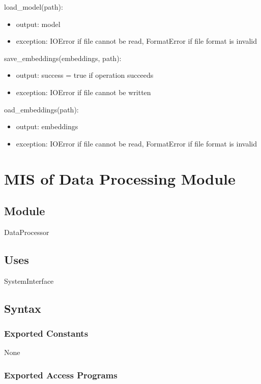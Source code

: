 \documentclass[12pt, titlepage]{article}
\begin{document}
\noindent load\_model(path):
\begin{itemize}
\item output: model
\item exception: IOError if file cannot be read, FormatError if file format is invalid
\end{itemize}

\noindent save\_embeddings(embeddings, path):
\begin{itemize}
\item output: success = true if operation succeeds
\item exception: IOError if file cannot be written
\end{itemize}

\noindent oad\_embeddings(path):
\begin{itemize}
\item output: embeddings
\item exception: IOError if file cannot be read, FormatError if file format is invalid
\end{itemize}


\section{MIS of Data Processing Module} \label{ModuleDP}

\subsection{Module}

DataProcessor

\subsection{Uses}
SystemInterface

\subsection{Syntax}

\subsubsection{Exported Constants}
None
\subsubsection{Exported Access Programs}
\end{document}
